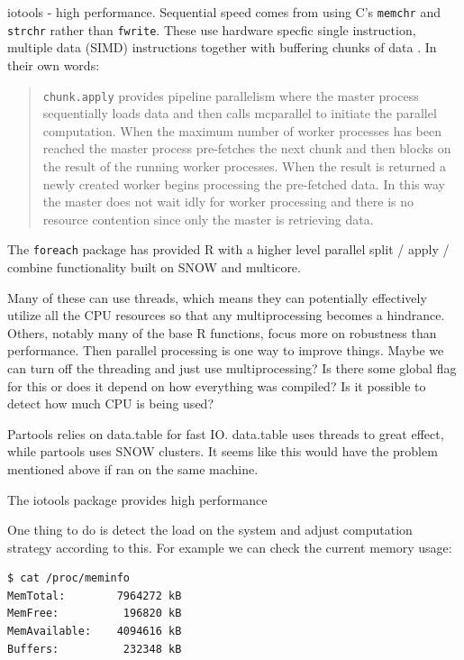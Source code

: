 \documentclass[12pt]{article}
\begin{document}
iotools - high performance. Sequential speed comes from
using C's \texttt{memchr} and \texttt{strchr} rather than \texttt{fwrite}.
These use hardware specfic single instruction, multiple data (SIMD)
instructions together with buffering chunks of data
\cite{arnold2015iotools}. In their own words:

\begin{quote}
    \texttt{chunk.apply} provides pipeline parallelism
    where the master process sequentially loads data and then calls
    mcparallel to initiate the parallel computation. When the maximum
    number of worker processes has been reached the master process
    pre-fetches the next chunk and then blocks on the result of the running
    worker processes. When the result is returned a newly created worker
    begins processing the pre-fetched data. In this way the master does not
    wait idly for worker processing and there is no resource contention
    since only the master is retrieving data. \cite{arnold2015iotools}
\end{quote}

The \texttt{foreach} package has provided R with a higher level parallel
split / apply / combine functionality built on SNOW and multicore.

Many of these can use threads, which means they can potentially effectively
utilize all the CPU resources so that any multiprocessing becomes a hindrance.
Others, notably many of the base R functions, focus more on robustness than
performance. Then parallel processing is one way to improve things.
Maybe we can turn off the threading and just use multiprocessing? Is there
some global flag for this or does it depend on how everything was compiled?
Is it possible to detect how much CPU is being used?

Partools relies on data.table for fast IO. data.table uses
threads to great effect, while partools uses SNOW clusters. It seems like
this would have the problem mentioned above if ran on the same machine.

The iotools package provides high performance

One thing to do is detect the load on the system and adjust computation
strategy according to
this. For example we can check the current memory usage:

\begin{verbatim}
$ cat /proc/meminfo
MemTotal:        7964272 kB
MemFree:          196820 kB
MemAvailable:    4094616 kB
Buffers:          232348 kB
\end{verbatim}
\end{document}
